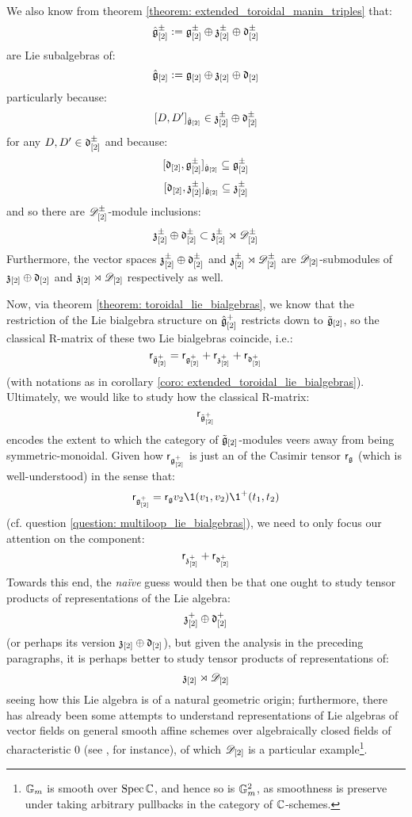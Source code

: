         We also know from theorem \ref{theorem: extended_toroidal_manin_triples} that:
            $$\hat{\mathfrak{g}}_{[2]}^{\pm} := \mathfrak{g}_{[2]}^{\pm} \oplus \mathfrak{z}_{[2]}^{\pm} \oplus \mathfrak{d}_{[2]}^{\pm}$$
        are Lie subalgebras of:
            $$\hat{\mathfrak{g}}_{[2]} := \mathfrak{g}_{[2]} \oplus \mathfrak{z}_{[2]} \oplus \mathfrak{d}_{[2]}$$
        particularly because:
            $$[D, D']_{\hat{\mathfrak{g}}_{[2]}} \in \mathfrak{z}_{[2]}^{\pm} \oplus \mathfrak{d}_{[2]}^{\pm}$$
        for any $D, D' \in \mathfrak{d}_{[2]}^{\pm}$ and because:
            $$[\mathfrak{d}_{[2]}, \mathfrak{g}_{[2]}^{\pm}]_{\hat{\mathfrak{g}}_{[2]}} \subseteq \mathfrak{g}_{[2]}^{\pm}$$
            $$[\mathfrak{d}_{[2]}, \mathfrak{z}_{[2]}^{\pm}]_{\hat{\mathfrak{g}}_{[2]}} \subseteq \mathfrak{z}_{[2]}^{\pm}$$
        and so there are $\mathscr{D}_{[2]}^{\pm}$-module inclusions:
            $$\mathfrak{z}_{[2]}^{\pm} \oplus \mathfrak{d}_{[2]}^{\pm} \subset \mathfrak{z}_{[2]}^{\pm} \rtimes \mathscr{D}_{[2]}^{\pm}$$
        Furthermore, the vector spaces $\mathfrak{z}_{[2]}^{\pm} \oplus \mathfrak{d}_{[2]}^{\pm}$ and $\mathfrak{z}_{[2]}^{\pm} \rtimes \mathscr{D}_{[2]}^{\pm}$ are $\mathscr{D}_{[2]}$-submodules of $\mathfrak{z}_{[2]} \oplus \mathfrak{d}_{[2]}$ and $\mathfrak{z}_{[2]} \rtimes \mathscr{D}_{[2]}$ respectively as well. 

        Now, via theorem \ref{theorem: toroidal_lie_bialgebras}, we know that the restriction of the Lie bialgebra structure on $\hat{\mathfrak{g}}_{[2]}^+$ restricts down to $\tilde{\mathfrak{g}}_{[2]}$, so the classical R-matrix of these two Lie bialgebras coincide, i.e.:
            $$\mathsf{r}_{\tilde{\mathfrak{g}}_{[2]}^+} = \mathsf{r}_{\mathfrak{g}_{[2]}^+} + \mathsf{r}_{\mathfrak{z}_{[2]}^+} + \mathsf{r}_{\mathfrak{d}_{[2]}^+}$$
        (with notations as in corollary \ref{coro: extended_toroidal_lie_bialgebras}). Ultimately, we would like to study how the classical R-matrix:
            $$\mathsf{r}_{\tilde{\mathfrak{g}}_{[2]}^+}$$
        encodes the extent to which the category of $\tilde{\mathfrak{g}}_{[2]}$-modules veers away from being symmetric-monoidal. Given how $\mathsf{r}_{\mathfrak{g}_{[2]}^+}$ is just an  of the Casimir tensor $\mathsf{r}_{\mathfrak{g}}$ (which is well-understood) in the sense that:
            $$\sfr_{\g_{[2]}^+} = \sfr_{\g} v_2 \1(v_1, v_2) \1^+(t_1, t_2)$$
        (cf. question \ref{question: multiloop_lie_bialgebras}), we need to only focus our attention on the component:
            $$\mathsf{r}_{\mathfrak{z}_{[2]}^+} + \mathsf{r}_{\mathfrak{d}_{[2]}^+}$$
        Towards this end, the \textit{na\"ive} guess would then be that one ought to study tensor products of representations of the Lie algebra:
            $$\mathfrak{z}_{[2]}^+ \oplus \mathfrak{d}_{[2]}^+$$
        (or perhaps its  version $\mathfrak{z}_{[2]} \oplus \mathfrak{d}_{[2]}$), but given the analysis in the preceding paragraphs, it is perhaps better to study tensor products of representations of:
            $$\mathfrak{z}_{[2]} \rtimes \mathscr{D}_{[2]}$$
        seeing how this Lie algebra is of a natural geometric origin; furthermore, there has already been some attempts to understand representations of Lie algebras of vector fields on general smooth affine schemes over algebraically closed fields of characteristic $0$ (see \cite{billig_lie_algebras_of_vector_fields_on_smooth_affine_varieties}, for instance), of which $\mathscr{D}_{[2]}$ is a particular example\footnote{$\mathbb{G}_m$ is smooth over $\operatorname{Spec} \mathbb{C}$, and hence so is $\mathbb{G}_m^2$, as smoothness is preserve under taking arbitrary pullbacks in the category of $\mathbb{C}$-schemes.}. 

